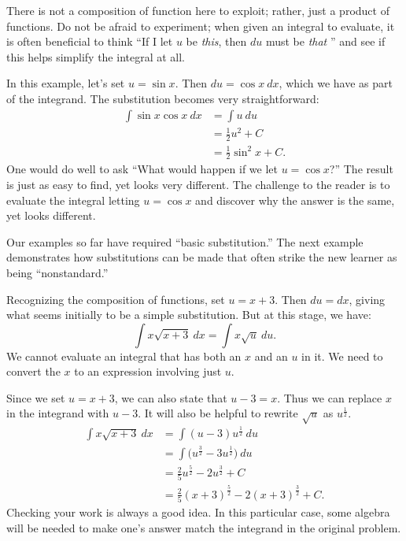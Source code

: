 {There is not a composition of function here to exploit; rather, just a product of functions. Do not be afraid to experiment; when given an integral to evaluate, it is often beneficial to think ``If I let $u$ be \textit{this}, then $du$ must be \textit{that} \dotso'' and see if this helps simplify the integral at all.

In this example, let's set $u = \sin x$. Then $du = \cos x\ dx$, which we have as part of the integrand. The substitution becomes very straightforward:
\begin{align*}
	\int \sin x\cos x\ dx
	&=	\int u\ du \\
	&= \frac12u^2+ C \\
	&= \frac12\sin^2 x + C.
\end{align*}
One would do well to ask ``What would happen if we let $u = \cos x$?'' The result is just as easy to find, yet looks very different. The challenge to the reader is to evaluate the integral letting $u = \cos x$ and discover why the answer is the same, yet looks different.}

Our examples so far have required ``basic substitution.'' The next example demonstrates how substitutions can be made that often strike the new learner as being ``nonstandard.''

{Recognizing the composition of functions, set $u = x+3$. Then $du = dx$, giving what seems initially to be a simple substitution. But at this stage, we have:
	\[\int x\sqrt{x+3}\ dx = \int x\sqrt{u}\ du.\]
We cannot evaluate an integral that has both an $x$ and an $u$ in it. We need to convert the $x$ to an expression involving just $u$.

Since we set $u = x+3$, we can also state that $u-3 = x$. Thus we can replace $x$ in the integrand with $u-3$. It will also be helpful to rewrite $\sqrt{u}$ as $u^\frac12$.
\begin{align*}
	\int x\sqrt{x+3} \ dx
	&= \int (u-3)u^\frac12\ du \\
	&= \int \big(u^\frac32 - 3u^\frac12\big) \ du \\
	&= \frac25u^\frac52 - 2u^\frac32 + C \\
	&= \frac25(x+3)^\frac52 - 2(x+3)^\frac32 + C.
\end{align*}
Checking your work is always a good idea. In this particular case, some algebra will be needed to make one's answer match the integrand in the original problem.}


